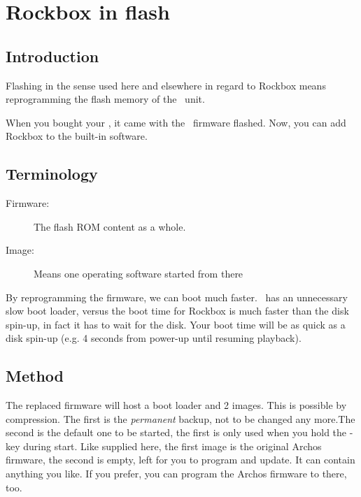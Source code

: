 \section{\label{ref:Rockboxinflash}Rockbox in flash}


\subsection{Introduction}
Flashing in the sense used here and elsewhere in regard to Rockbox means 
reprogramming the flash memory of the \playerman\ unit.

When you bought your \playerman, it came with the \playerman\ firmware flashed.
Now, you can add Rockbox to the built-in software.

\subsection{Terminology}
\begin{description}
\item[Firmware: ] The flash ROM content as a whole.
\item[Image: ] Means one operating software started from there
\end{description}

By reprogramming the firmware, we can boot much faster. \playerman\ has an 
unnecessary slow boot loader, versus the boot time for Rockbox is much faster 
than the disk spin-up, in fact it has to wait for the disk. Your boot time will 
be as quick as a disk spin-up (e.g. 4 seconds from power-up until resuming 
playback).

\subsection{Method}

The replaced firmware will host a boot loader and 2 images. This is possible by 
compression. The first is the \emph{permanent} backup, not to be changed any 
more.The second is the default one to be started, the first is only used when 
you hold the  -key during start. Like supplied here, the first image 
is the original Archos firmware, the second is empty, left for you to program 
and update. It can contain anything you like. If you prefer, you can program 
the Archos firmware to there, too.

